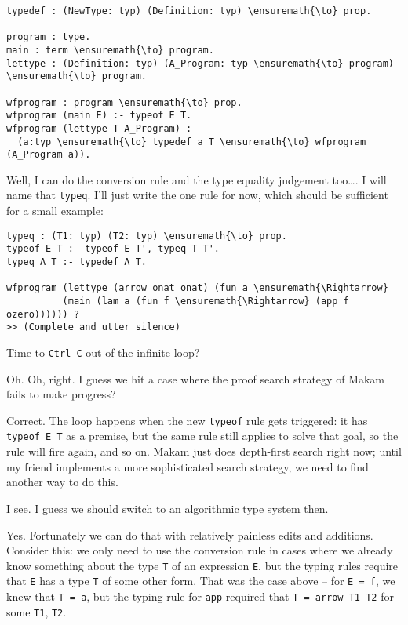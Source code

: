 \begin{verbatim}
typedef : (NewType: typ) (Definition: typ) \ensuremath{\to} prop.

program : type. 
main : term \ensuremath{\to} program. 
lettype : (Definition: typ) (A_Program: typ \ensuremath{\to} program) \ensuremath{\to} program.

wfprogram : program \ensuremath{\to} prop.
wfprogram (main E) :- typeof E T.
wfprogram (lettype T A_Program) :-
  (a:typ \ensuremath{\to} typedef a T \ensuremath{\to} wfprogram (A_Program a)).
\end{verbatim}

Well, I can do the conversion rule and the type equality judgement
too\ldots{}. I will name that \texttt{typeq}. I'll just write the one
rule for now, which should be sufficient for a small example:

\begin{verbatim}
typeq : (T1: typ) (T2: typ) \ensuremath{\to} prop.
typeof E T :- typeof E T', typeq T T'.
typeq A T :- typedef A T.

wfprogram (lettype (arrow onat onat) (fun a \ensuremath{\Rightarrow}
          (main (lam a (fun f \ensuremath{\Rightarrow} (app f ozero)))))) ?
>> (Complete and utter silence)
\end{verbatim}

\heroADVISOR{} Time to \texttt{Ctrl-C} out of the infinite loop?

\heroSTUDENT{} Oh. Oh, right. I guess we hit a case where the proof search
strategy of Makam fails to make progress?

\heroADVISOR{} Correct. The loop happens when the new \texttt{typeof} rule
gets triggered: it has \texttt{typeof\ E\ T\textquotesingle{}} as a
premise, but the same rule still applies to solve that goal, so the rule
will fire again, and so on. Makam just does depth-first search right
now; until my friend implements a more sophisticated search strategy, we
need to find another way to do this.

\heroSTUDENT{} I see. I guess we should switch to an algorithmic type system
then.

\heroADVISOR{} Yes. Fortunately we can do that with relatively painless edits
and additions. Consider this: we only need to use the conversion rule in
cases where we already know something about the type \texttt{T} of an
expression \texttt{E}, but the typing rules require that \texttt{E} has
a type \texttt{T\textquotesingle{}} of some other form. That was the
case above -- for \texttt{E\ =\ f}, we knew that \texttt{T\ =\ a}, but
the typing rule for \texttt{app} required that
\texttt{T\textquotesingle{}\ =\ arrow\ T1\ T2} for some \texttt{T1},
\texttt{T2}.


